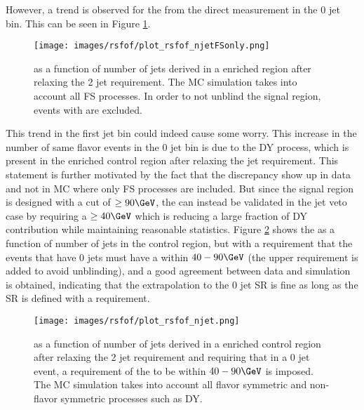 However, a trend is observed for the \Rsfof from the direct measurement in the 0 jet bin. This can be seen in Figure \ref{fig:rsfofSleptonOne}.
\begin{figure}[htbp!]
\begin{center}
    \texttt{[image: images/rsfof/plot\_rsfof\_njetFSonly.png]}
    \caption{\Rsfof as a function of number of jets derived in a \ttbar enriched region after relaxing the 2 jet requirement. The MC simulation takes into account all FS processes. In order to not unblind the signal region, events with are excluded.}
\label{fig:rsfofSleptonOne}
\end{center}
\end{figure}                                                                                                                                                                                                                                                                                                                                                               
This trend in the first jet bin could indeed cause some worry. 
This increase in the number of same flavor events in the 0 jet bin is due to the DY process, which is present in the \ttbar enriched control region after relaxing the jet requirement. 
This statement is further motivated by the fact that the discrepancy show up in data and not in MC where only FS processes are included. 
But since the signal region is designed with a cut of \mttwo$\geq90\GeV$, the \Rsfof can instead be validated in the jet veto case by requiring a \mttwo$\geq40\GeV$ which is reducing a large fraction of DY contribution while maintaining reasonable statistics. 
Figure \ref{fig:rsfofSleptonTwo} shows the \Rsfof as a function of number of jets in the \ttbar control region, but with a requirement that the events that have 0 jets must have a \mttwo within $40-90\GeV$ (the upper requirement is added to avoid unblinding), and a good agreement between data and simulation is obtained, indicating that the extrapolation to the 0 jet SR is fine as long as the SR is defined with a \mttwo requirement. 
\begin{figure}[htbp!]
\begin{center}
    \texttt{[image: images/rsfof/plot\_rsfof\_njet.png]}
\caption{\Rsfof as a function of number of jets derived in a \ttbar enriched control region after relaxing the 2 jet requirement and requiring that in a 0 jet event, a requirement of the \mttwo to be within $40-90\GeV$ is imposed. The MC simulation takes into account all flavor symmetric and non-flavor symmetric processes such as DY.}
\label{fig:rsfofSleptonTwo}
\end{center}
\end{figure}                                                                                                            
